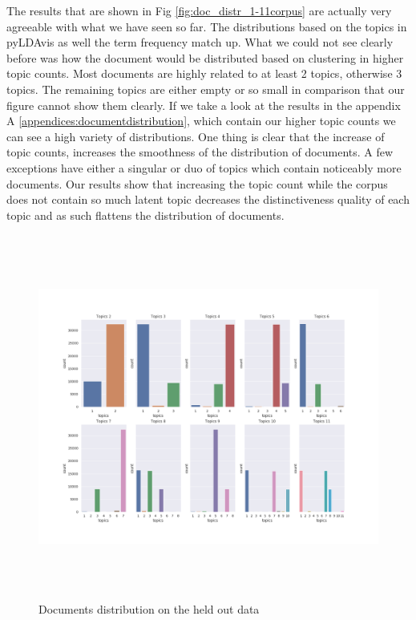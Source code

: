 The results that are shown in Fig \ref{fig:doc_distr_1-11corpus} are actually very agreeable with what we have seen so far. The distributions based on the topics in pyLDAvis as well the term frequency match up. What we could not see clearly before was how the document would be distributed based on clustering in higher topic counts. Most documents are highly related to at least 2 topics, otherwise 3 topics. The remaining topics are either empty or so small in comparison that our figure cannot show them clearly. If we take a look at the results in the appendix A \ref{appendices:documentdistribution}, which contain our higher topic counts we can see a high variety of distributions. One thing is clear that the increase of topic counts, increases the smoothness of the distribution of documents. A few exceptions have either a singular or duo of topics which contain noticeably more documents. Our results show that increasing the topic count while the corpus does not contain so much latent topic decreases the distinctiveness quality of each topic and as such flattens the distribution of documents.

\begin{figure}[h]
    \centering
    \includegraphics[width=16cm, height=12cm]{figures/doc_distr/doc_distribution_1-11.png}
    \caption{Documents distribution on the held out data}
    \label{fig:doc_distr_1-11held_out}
\end{figure}
\FloatBarrier

